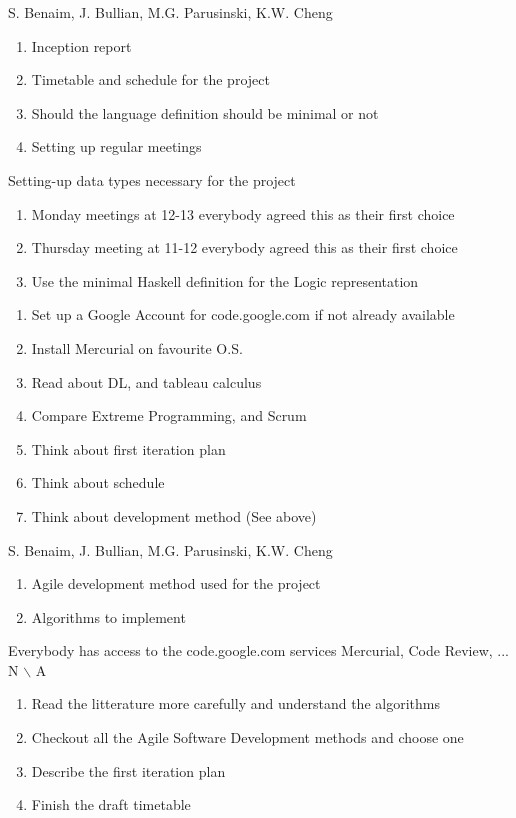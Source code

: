 %
{S. Benaim, J. Bullian, M.G. Parusinski, K.W. Cheng}%
{ \begin{enumerate} \item Inception report
\item Timetable and schedule for the project
\item Should the language definition should be minimal or not
\item Setting up regular meetings
\end{enumerate} }%
{Setting-up data types necessary for the project}%
{\begin{enumerate}
\item Monday meetings at 12-13 everybody agreed this as their first choice
\item Thursday meeting at 11-12 everybody agreed this as their first choice
\item Use the minimal Haskell definition for the Logic representation
\end{enumerate}}
{\begin{enumerate}
\item Set up a Google Account for code.google.com if not already available
\item Install Mercurial on favourite O.S.
\item Read about DL, and tableau calculus
\item Compare Extreme Programming, and Scrum
\item Think about first iteration plan
\item Think about schedule
\item Think about development method (See above)
\end{enumerate}}%

%
{S. Benaim, J. Bullian, M.G. Parusinski, K.W. Cheng}%
{ \begin{enumerate} 
\item Agile development method used for the project
\item Algorithms to implement
\end{enumerate} }%
{Everybody has access to the code.google.com services Mercurial, Code Review, ...}%
{N $\backslash$ A}
{\begin{enumerate}
\item Read the litterature more carefully and understand the algorithms
\item Checkout all the Agile Software Development methods and choose one
\item Describe the first iteration plan
\item Finish the draft timetable
\end{enumerate}}%

